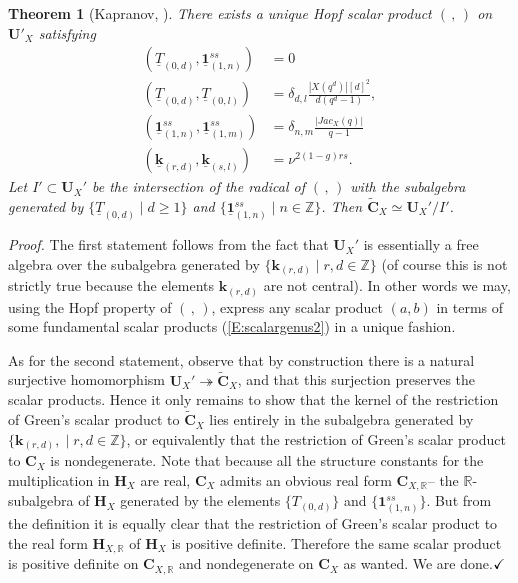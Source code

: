 \documentclass[a4paper,10pt]{amsart}
\def\Z{\mathbb{Z}}
\def\H{\mathbf{H}}
\def\U{\mathbf{U}}
\def\qed{$\hfill \checkmark$}
\def\tto{\twoheadrightarrow}
\def\CC{\mathbf{C}}
\newtheorem{theo}{\bf{Theorem}}[section]
\numberwithin{equation}{section}
\begin{document}
{\begin{theo}[Kapranov, \cite{Kap1}]\label{T:Kappo2} There exists a unique Hopf scalar product $(\,,\,)$ on ${\U}'_X$ satisfying
\begin{equation}\label{E:scalargenus2}
\begin{split}
(\underline{T}_{(0,d)},\underline{\mathbf{1}}^{ss}_{(1,n)})&=0\\
(\underline{T}_{(0,d)},\underline{T}_{(0,l)})&=\delta_{d,l} \frac{|X(q^d)|[d]^2}{d(q^d-1)},\\
(\underline{\mathbf{1}}^{ss}_{(1,n)},\underline{\mathbf{1}}^{ss}_{(1,m)})&=\delta_{n,m} \frac{|Jac_X(q)|}{q-1}\\
(\underline{\mathbf{k}}_{(r,d)},\underline{\mathbf{k}}_{(s,l)})&=\nu^{2(1-g)rs}.
\end{split}
\end{equation}
Let $I' \subset {\U}_X'$ be the intersection of the radical of $(\,,\,)$ with the subalgebra generated by $\{\underline{T}_{(0,d)}\;|\; d \geq 1\}$ and $\{\underline{\mathbf{1}}^{ss}_{(1,n)}\;|\; n \in \Z\}$. Then $\widetilde{\CC}_X \simeq {\U}_X'/I'$.
\end{theo}
\noindent
\textit{Proof.} The first statement follows from the fact that ${\U}_X'$ is essentially a free algebra over the subalgebra generated by $\{\mathbf{k}_{(r,d)}\;|\; r,d \in \Z\}$ (of course this is not strictly true because
the elements $\mathbf{k}_{(r,d)}$ are not central). In other words we may, using the Hopf property of $(\,,\,)$, express any scalar product $(a,b)$ in terms of some fundamental scalar products
(\ref{E:scalargenus2}) in a unique fashion.

As for the second statement, observe that by construction there is a natural surjective homomorphism
${\U}_X' \tto \widetilde{\CC}_X$, and that this surjection preserves the scalar products. Hence it only remains to show that the kernel of the restriction of Green's scalar product to $\widetilde{\CC}_X$ lies entirely in the subalgebra generated by $\{\mathbf{k}_{(r,d)},\;|\; r,d \in \Z\}$, or equivalently that the restriction of Green's scalar product to $\CC_X$ is nondegenerate. Note that because all the structure constants for the multiplication in $\H_{X}$ are real, $\CC_X$ admits an obvious real form $\CC_{X,\mathbb{R}}$-- the $\mathbb{R}$-subalgebra of $\H_{X}$ generated
by the elements $\{T_{(0,d)}\}$ and $\{\mathbf{1}^{ss}_{(1,n)}\}$. But from the definition it is equally clear that the restriction of Green's scalar product to the real form $\H_{X,\mathbb{R}}$ of $\H_X$ is positive definite. Therefore the same scalar product is positive definite on $\CC_{X,\mathbb{R}}$ and nondegenerate on $\CC_X$ as wanted. We are done.\qed

}
\end{document}
